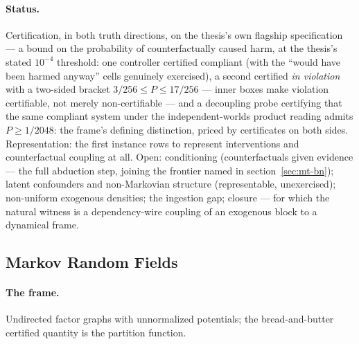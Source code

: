 \paragraph{Status.} Certification, in both truth directions, on the
thesis's own flagship specification --- a bound on the probability of
counterfactually caused harm, at the thesis's stated $10^{-4}$
threshold: one controller certified compliant (with the ``would have
been harmed anyway'' cells genuinely exercised), a second certified
\emph{in violation} with a two-sided bracket $3/256 \le P \le
17/256$ --- inner boxes make violation certifiable, not merely
non-certifiable --- and a decoupling probe certifying that the same
compliant system under the independent-worlds product reading admits
$P \ge 1/2048$: the frame's defining distinction, priced by
certificates on both sides. Representation: the first instance rows
to represent interventions and counterfactual coupling at all. Open:
conditioning (counterfactuals given evidence --- the full abduction
step, joining the frontier named in section~\ref{sec:mt-bn}); latent
confounders and non-Markovian structure (representable,
unexercised); non-uniform exogenous densities; the ingestion gap;
closure --- for which the natural witness is a dependency-wire
coupling of an exogenous block to a dynamical frame.



\subsection{Markov Random Fields}
\label{sec:mt-mrf}

\paragraph{The frame.} Undirected factor graphs with unnormalized
potentials; the bread-and-butter certified quantity is the partition
function.

